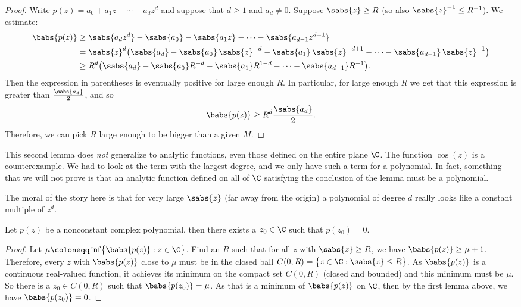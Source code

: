 \begin{proof}
Write $p(z) = a_0 + a_1 z + \cdots + a_d z^d$ and suppose that $d \geq 1$
and $a_d \not= 0$.
Suppose $\sabs{z} \geq R$ (so also $\sabs{z}^{-1} \leq R^{-1}$).
We estimate:
\begin{equation*}
\begin{split}
\babs{p(z)}
& \geq
\sabs{a_d z^d} -
\sabs{a_0} - \sabs{a_1 z} - \cdots - \sabs{a_{d-1} z^{d-1} }
\\
& =
\sabs{z}^d \bigl(
\sabs{a_d} -
\sabs{a_0} \, \sabs{z}^{-d} -
\sabs{a_1} \, \sabs{z}^{-d+1} - \cdots - \sabs{a_{d-1}} \, \sabs{z}^{-1}
\bigr)
\\
& \geq
R^d \bigl(\sabs{a_d} -
\sabs{a_0}R^{-d} - \sabs{a_1}R^{1-d} - \cdots - \sabs{a_{d-1}}R^{-1} \bigr)
.
\end{split}
\end{equation*}
Then the expression in parentheses is eventually positive for large enough
$R$.  In particular, for large enough $R$ we get that this expression
is greater than
$\frac{\sabs{a_d}}{2}$, and so
\begin{equation*}
\babs{p(z)}
\geq
R^d \frac{\sabs{a_d}}{2} .
\end{equation*}
Therefore,
we can pick $R$ large enough to be bigger than a given $M$.
\end{proof}

This second lemma does \emph{not} generalize to analytic
functions, even those defined on the entire plane $\C$.  The function
$\cos(z)$ is a counterexample.
We had to look
at the term with the largest degree, and we only have such a term for
a polynomial.  In fact, something that we will not prove is that
an analytic function defined on all of $\C$ satisfying the conclusion
of the lemma must be a polynomial.

The moral of the story here is that for very large $\sabs{z}$ (far away from
the origin) a polynomial of degree $d$ really looks like a constant multiple
of $z^d$.

\begin{thm}
%
Let $p(z)$ be a nonconstant complex polynomial, then there exists a $z_0 \in \C$
such that $p(z_0) = 0$.
\end{thm}

\begin{proof}
Let $\mu \coloneqq \inf \bigl\{ \babs{p(z)} : z \in \C \bigr\}$.  Find an $R$ such that
for all $z$ with $\sabs{z} \geq R$, we have $\babs{p(z)} \geq \mu+1$.
Therefore, every $z$ with $\babs{p(z)}$ close to $\mu$ must be in the
closed ball $C(0,R) = \bigl\{ z \in \C : \sabs{z} \leq R \bigr\}$.  As $\babs{p(z)}$
is a continuous real-valued function, it achieves its minimum
on the compact set $C(0,R)$ (closed and bounded) and this minimum must
be $\mu$.  So there is a $z_0 \in C(0,R)$ such that $\babs{p(z_0)} = \mu$.
As that is a minimum of $\babs{p(z)}$ on $\C$, then by the first lemma
above, we have $\babs{p(z_0)} = 0$.
\end{proof}

